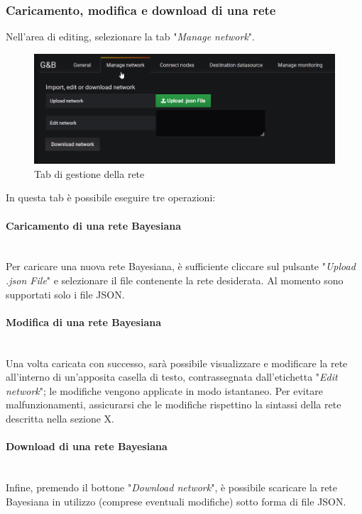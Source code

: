 \subsubsection{Caricamento, modifica e download di una rete}
Nell'area di editing, selezionare la tab "\textit{Manage network}".
\begin{figure} [H]
	\centering
	\includegraphics[scale=0.55]{Img/managenet} 
	\caption{Tab di gestione della rete} \label{} 
\end{figure} 
In questa tab è possibile eseguire tre operazioni:
\paragraph{Caricamento di una rete Bayesiana}~\\
	Per caricare una nuova rete Bayesiana, è sufficiente cliccare sul pulsante "\textit{Upload .json File}" e selezionare il file contenente la rete desiderata. Al momento sono supportati solo i file JSON.
\paragraph{Modifica di una rete Bayesiana}~\\
	Una volta caricata con successo, sarà possibile visualizzare e modificare la rete all'interno di un'apposita casella di testo, contrassegnata dall'etichetta "\textit{Edit network}"; le modifiche vengono applicate in modo istantaneo. Per evitare malfunzionamenti, assicurarsi che le modifiche rispettino la sintassi della rete descritta nella sezione X.
\paragraph{Download di una rete Bayesiana}~\\
	Infine, premendo il bottone "\textit{Download network}", è possibile scaricare la rete Bayesiana in utilizzo (comprese eventuali modifiche) sotto forma di file JSON.